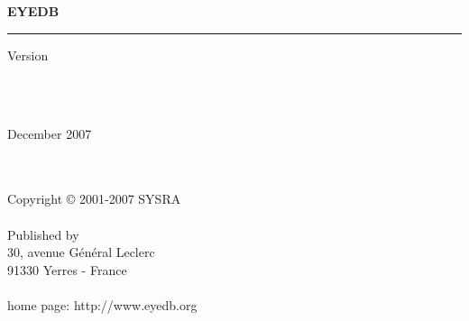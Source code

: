 
\thispagestyle{empty}

\mbox{ }
\\
\vspace{3 cm}
\\
{\bf{\Huge E{\LARGE YE}DB} \hspace{0.cm} {\Huge \mantitle}}
\\
\newcommand{\rulewidth}{17.2cm}
\rule{\rulewidth}{1.6mm}
\begin{flushright}
{\large Version \eyedbversion}
\end{flushright}
\mbox{ }
\\
\vspace{11 cm}
\\
\begin{flushright}
{\large December 2007}
\end{flushright}

\newpage

\thispagestyle{empty}

\mbox{ }
\\
\vspace{1cm}
\\
Copyright {\copyright} 2001-2007 SYSRA
\\
\vspace{1cm}
\\
Published by \sysra
\\
30, avenue G\'en\'eral Leclerc
\\
91330 Yerres - France
\\
\\
home page: http://www.eyedb.org

